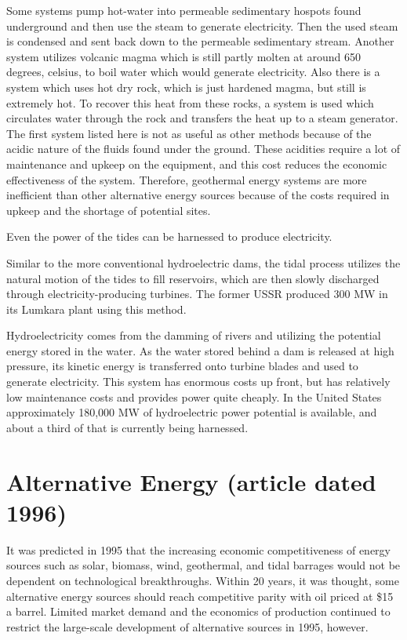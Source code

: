 \documentclass[a4paper]{article}
\begin{document}
Some systems pump hot-water into permeable sedimentary hospots found underground and then use the steam
to generate electricity. Then the used steam is condensed and sent back down to the permeable
sedimentary stream. Another system utilizes volcanic magma which is still partly molten at around
650 degrees, celsius, to boil water which would generate electricity. Also there is a system which
uses hot dry rock, which is just hardened magma, but still is extremely hot. To recover this heat
from these rocks, a system is used which circulates water through the rock and transfers the heat
up to a steam generator. The first system listed here is not as useful as other methods because of
the acidic nature of the fluids found under the ground. These acidities require a lot of maintenance
and upkeep on the equipment, and this cost reduces the economic effectiveness of the system.
Therefore, geothermal energy systems are more inefficient than other alternative energy sources because
of the costs required in upkeep and the shortage of potential sites.

Even the power of the tides can be harnessed to produce electricity.

Similar to the more conventional hydroelectric dams, the tidal process utilizes the natural motion
of the tides to fill reservoirs, which are then slowly discharged through electricity-producing turbines.
The former USSR produced 300 MW in its Lumkara plant using this method.

Hydroelectricity comes from the damming of rivers and utilizing the potential energy stored in the water.
As the water stored behind a dam is released at high pressure, its kinetic energy is transferred onto
turbine blades and used to generate electricity. This system has enormous costs up front, but has
relatively low maintenance costs and provides power quite cheaply. In the United States approximately
180,000 MW of hydroelectric power potential is available, and about a third of that is currently
being harnessed.

\section{Alternative Energy (article dated 1996)}

It was predicted in 1995 that the increasing economic competitiveness of energy sources such as solar,
biomass, wind, geothermal, and tidal barrages would not be dependent on technological breakthroughs.
Within 20 years, it was thought, some alternative energy sources should reach competitive parity
with oil priced at \$15 a barrel. Limited market demand and the economics of production continued
to restrict the large-scale development of alternative sources in 1995, however.
\end{document}
